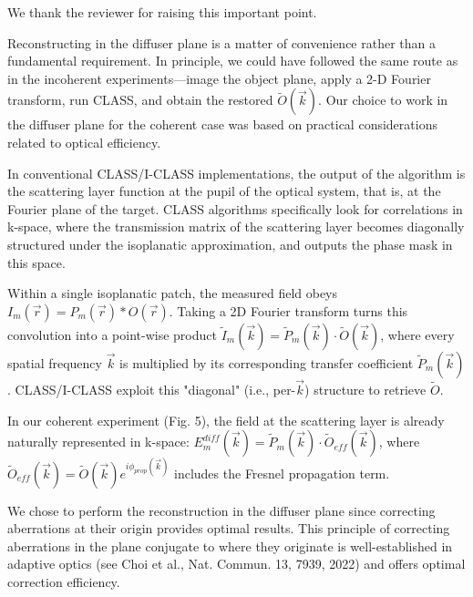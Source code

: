 \documentclass[12pt]{article}
\newcommand{\hlred}[1]{\sethlcolor{red!30}\hl{#1}}
\newenvironment{ourresponse}
    {\begin{tcolorbox}[width=\linewidth,breakable,enhanced,colback=gray!5,colframe=responsecolor!50,title=Response,left=5pt,right=5pt]}
    {\end{tcolorbox}}
\begin{document}
\begin{enumerate}[label=\arabic*.]
\begin{ourresponse}

        We thank the reviewer for raising this important point.
    
        Reconstructing in the diffuser plane is a matter of convenience rather than a fundamental requirement. In principle, we could have followed the same route as in the incoherent experiments—image the object plane, apply a 2-D Fourier transform, run CLASS, and obtain the restored $\tilde{O}(\vec{k})$. Our choice to work in the diffuser plane for the coherent case was based on practical considerations related to optical efficiency.
        
        In conventional CLASS/I-CLASS implementations, the output of the algorithm is the scattering layer function at the pupil of the optical system, that is, at the Fourier plane of the target. CLASS algorithms specifically look for correlations in k-space, where the transmission matrix of the scattering layer becomes diagonally structured under the isoplanatic approximation, and outputs the phase mask in this space.
        
        Within a single isoplanatic patch, the measured field obeys $I_m(\vec{r})=P_m(\vec{r})*O(\vec{r})$. Taking a 2D Fourier transform turns this convolution into a point-wise product $\tilde{I}_m(\vec{k})=\tilde{P}_m(\vec{k})\cdot\tilde{O}(\vec{k})$, where every spatial frequency $\vec{k}$ is multiplied by its corresponding transfer coefficient $\tilde{P}_m(\vec{k})$. CLASS/I-CLASS exploit this "diagonal" (i.e., per-$\vec{k}$) structure to retrieve $\tilde{O}$.
        
        In our coherent experiment (Fig. 5), the field at the scattering layer is already naturally represented in k-space:
        $E^{diff}_m(\vec{k})=\tilde{P}_m(\vec{k})\cdot\tilde{O}_{eff}(\vec{k})$,
        where $\tilde{O}_{eff}(\vec{k}) = \tilde{O}(\vec{k})e^{i\phi_{prop}(\vec{k})}$ includes the Fresnel propagation term.
        
        We chose to perform the reconstruction in the diffuser plane since correcting aberrations at their origin provides optimal results. This principle of correcting aberrations in the plane conjugate to where they originate is well-established in adaptive optics (see Choi et al., Nat. Commun. 13, 7939, 2022) and offers optimal correction efficiency.
        

\end{ourresponse}
\end{enumerate}
\end{document}
